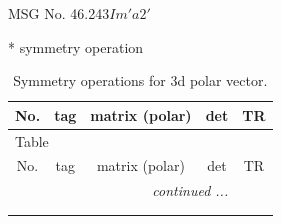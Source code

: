\documentclass[fleqn,8pt]{jsarticle}
\begin{document}
\setcounter{MaxMatrixCols}{32}

\renewcommand{\tablename}{Table~}
\renewcommand{\figurename}{Figure~}
\begin{center}
\LARGE
MSG No. 46.243\quad$Im'a2'$
\end{center}
* symmetry operation
\renewcommand{\arraystretch}{1.3}
\begin{longtable}{ccccc}
\caption{Symmetry operations for 3d polar vector.}
 \\
 \hline \hline
No. & tag & matrix (polar) & det & TR \\ \hline \endfirsthead

\multicolumn{4}{l}{\tablename\ \thetable{}} \\
 \hline \hline
No. & tag & matrix (polar) & det & TR \\ \hline \endhead

 \hline \hline
\multicolumn{4}{r}{\footnotesize\it continued ...} \\ \endfoot

 \hline \hline
\multicolumn{4}{r}{} \\ \endlastfoot


\end{longtable}
\end{document}
